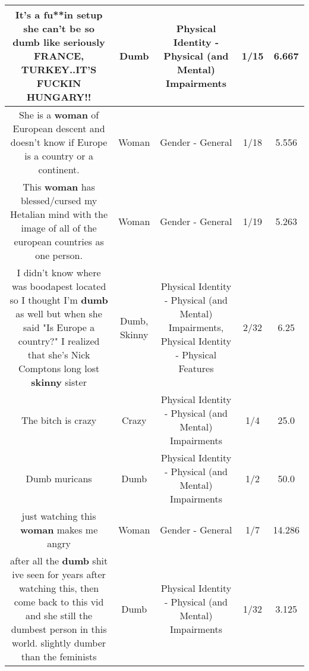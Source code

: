 \documentclass[11pt]{article}
\newlength\mylength
\begin{document}
\begin{center}
\begin{longtable}{|C{.65\mylength}|C{.30\mylength}|C{.12\mylength}|C{.12\mylength}|C{.12\mylength}|}
  \small It's a fu**in setup she can't be so \textbf{dumb} like seriously FRANCE, TURKEY..IT'S FUCKIN HUNGARY!!\normalsize   & Dumb & Physical Identity - Physical (and Mental) Impairments & 1/15 & 6.667 \\  \hline
  \small She is a \textbf{woman} of European descent and doesn't know if Europe is a country or a continent.\normalsize   & Woman & Gender - General & 1/18 & 5.556 \\  \hline
  \small This \textbf{woman} has blessed/cursed my Hetalian mind with the image of all of the european countries as one person.\normalsize   & Woman & Gender - General & 1/19 & 5.263 \\  \hline
  \small I didn't know where was boodapest located so I thought I'm \textbf{dumb} as well but when she said "Is Europe a country?" I realized that she's Nick Comptons long lost \textbf{skinny} sister\normalsize   & Dumb, Skinny & Physical Identity - Physical (and Mental) Impairments, Physical Identity - Physical Features & 2/32 & 6.25 \\  \hline
  \small The bitch is crazy\normalsize   & Crazy & Physical Identity - Physical (and Mental) Impairments & 1/4 & 25.0 \\  \hline
  \small Dumb muricans\normalsize   & Dumb & Physical Identity - Physical (and Mental) Impairments & 1/2 & 50.0 \\  \hline
  \small just watching this \textbf{woman} makes me angry\normalsize   & Woman & Gender - General & 1/7 & 14.286 \\  \hline
  \small after all the \textbf{dumb} shit ive seen for years after watching this, then come back to this vid and she still the dumbest person in this world. slightly dumber than the feminists\normalsize   & Dumb & Physical Identity - Physical (and Mental) Impairments & 1/32 & 3.125 \\  \hline

\end{longtable}
\end{center}
\end{document}
